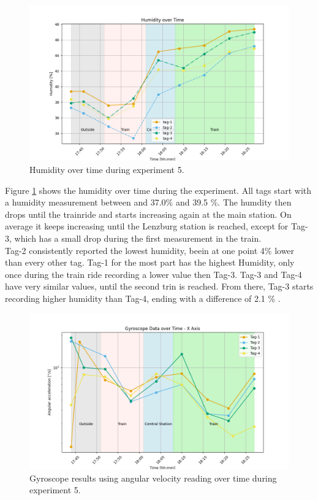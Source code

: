 \begin{figure}[ht!]
	\includegraphics[width=\linewidth]{graphics/exp/exp6_hum_plot_2.png}
	\caption{Humidity over time during experiment 5.}
	\label{f:ex5_train_hum}
\end{figure}

Figure \ref{f:ex5_train_hum} shows the humidity over time during the experiment.
All tags start with a humidity measurement between and 37.0\% and 39.5 \%.
The humdity then drops until the trainride and starts increasing again at the main station.
On average it keeps increasing until the Lenzburg station is reached, except for Tag-3, which has a small drop during the first measurement in the train. \\
Tag-2 consistently reported the lowest humidity, beein at one point 4\% lower than every other tag.
Tag-1 for the most part has the highest Humidity, only once during the train ride recording a lower value then Tag-3.
Tag-3 and Tag-4 have very similar values, until the second trin is reached.
From there, Tag-3 starts recording higher humidity than Tag-4, ending with a difference of 2.1 \% .


\begin{figure}[ht!]
	\includegraphics[width=\linewidth]{graphics/exp/exp6_gyro_data_x_split_2.png}
	\caption{Gyroscope results using angular velocity reading over time during experiment 5.}
	\label{f:ex5_train_gyro_x}
\end{figure}

